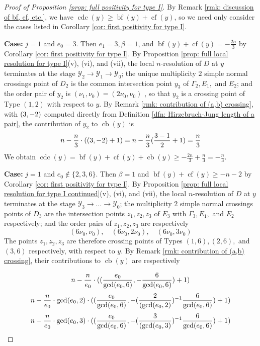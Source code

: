 \documentclass[12pt]{amsart}
\numberwithin{equation}{section}
\theoremstyle{definition}
\newcommand{\Y}{\mathcal{Y}}
\let\L\relax
\DeclareMathOperator{\blf}{bf}
\DeclareMathOperator{\cf}{cf}
\DeclareMathOperator{\cb}{cb}
\DeclareMathOperator{\cdc}{cdc}
\DeclareMathOperator{\L}{L}
\begin{document}
\begin{proof}[Proof of Proposition \ref{prop: full positivity for type I}]
    By Remark \ref{rmk: discussion of bf, cf, etc.}, we have $\cdc(y)\geq\blf(y)+\cf(y)$, so we need only consider the cases listed in Corollary \ref{cor: first positivity for type I}.
    
    \textbf{Case:} $j=1$ and $e_0=3$. Then $e_1=3,\beta=1$, and $\blf(y)+\cf(y)=-\frac{2n}{3}$ by Corollary \ref{cor: first positivity for type I}. By Proposition \ref{prop: full local resolution for type I}(v), (vi), and (vii), the local $n$-resolution of $D$ at $y$ terminates at the stage $\Y_2\to\Y_1\to\Y_0$; the unique multiplicity $2$ simple normal crossings point of $D_2$ is the common intersection point $y_3$ of $\Gamma_2, E_1,$ and $E_2$; and the order %
    pair of $y_2$ is $(\nu_1,\nu_0)=(2\nu_0,\nu_0)$%
    , so that $y_2$ is a crossing point of Type $(1,2)$ with respect to $y$. By Remark \ref{rmk: contribution of (a,b) crossing}, with $\L(3,-2)$ computed directly from Definition \ref{dfn: Hirzebruch-Jung length of a pair}, the contribution of $y_2$ to $\cb(y)$ is
    \[n-\frac{n}{3}\cdot(\L(3,-2)+1)=n-\frac{n}{3}(\frac{3-1}{2}+1)=\frac{n}{3}\]
    We obtain $\cdc(y)=\blf(y)+\cf(y)+\cb(y)\geq-\frac{2n}{3}+\frac{n}{3}=-\frac{n}{3}$.

    \textbf{Case:} $j=1$ and $e_0\not\in\{2,3,6\}$. Then $\beta=1$ and $\blf(y)+\cf(y)\geq-n-2$ by Corollary \ref{cor: first positivity for type I}. By Proposition \ref{prop: full local resolution for type I continued}(v), (vi), and (vii),  the local $n$-resolution of $D$ at $y$ terminates at the stage $\Y_3\to...\to\Y_0$; the  multiplicity $2$ simple normal crossings points of $D_3$ are the intersection points $z_1,z_2,z_3$ of $E_3$ with $\Gamma_3,E_1,$ and $E_2$ respectively; and the order pairs of $z_1,z_2,z_3$ are respectively
    \[(6\nu_0,\nu_0),\quad(6\nu_0,2\nu_0),\quad(6\nu_0,3\nu_0)\]
    The points $z_1,z_2,z_3$ are therefore crossing points of Types $(1,6),(2,6),$ and $(3,6)$ respectively, with respect to $y$. By Remark \ref{rmk: contribution of (a,b) crossing}, their contributions  to $\cb(y)$ are respectively

    \[n-\frac{n}{e_0}\cdot(\L(\frac{e_0}{\gcd(e_0,6)},-\frac{6}{\gcd(e_0,6)})+1)\]
    \[n-\frac{n}{e_0}\cdot\gcd(e_0,2)\cdot(\L(\frac{e_0}{\gcd(e_0,6)},-(\frac{2}{(\gcd(e_0,2)})^{-1}\frac{6}{\gcd(e_0,6)})+1)\]
    \[n-\frac{n}{e_0}\cdot\gcd(e_0,3)\cdot(\L(\frac{e_0}{\gcd(e_0,6)},-(\frac{3}{(\gcd(e_0,3)})^{-1}\frac{6}{\gcd(e_0,6)})+1)\]


\end{proof}
\end{document}
